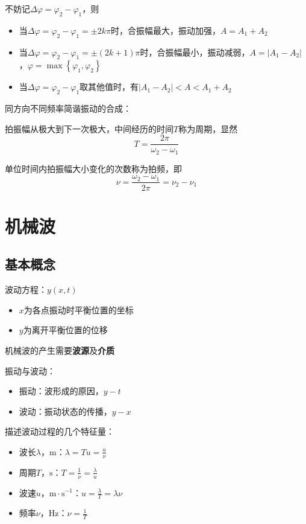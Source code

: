 \documentclass[12pt, a4paper, twoside]{ctexbook}
\begin{document}
不妨记$\Delta\varphi=\varphi_2-\varphi_1$，则
\begin{itemize}
    \item 当$\Delta\varphi=\varphi_2-\varphi_1=\pm 2k\pi$时，合振幅最大，振动加强，$A=A_1+A_2$
    \item 当$\Delta\varphi=\varphi_2-\varphi_1=\pm\left(2k+1\right)\pi$时，合振幅最小，振动减弱，$A=\left|A_1-A_2\right|$，$\varphi=\max\left\{\varphi_1,\varphi_2\right\}$
    \item 当$\Delta\varphi=\varphi_2-\varphi_1$取其他值时，有$\left|A_1-A_2\right|<A<A_1+A_2$
\end{itemize}

{\sonti 同方向不同频率简谐振动的合成}：

拍振幅从极大到下一次极大，中间经历的时间$T$称为周期，显然
$$
T=\frac{2\pi}{\omega_2-\omega_1}
$$

单位时间内拍振幅大小变化的次数称为拍频，即
$$
\nu=\frac{\omega_2-\omega_1}{2\pi}=\nu_2-\nu_1
$$
\chapter{机械波}
\newpage
\section{基本概念}
{\sonti 波动方程}：$y\left(x,t\right)$
\begin{itemize}
    \item $x$为各点振动时平衡位置的坐标
    \item $y$为离开平衡位置的位移
\end{itemize}

{\sonti 机械波}的产生需要\textbf{波源}及\textbf{介质}

{\sonti 振动与波动}：
\begin{itemize}
    \item 振动：波形成的原因，$y-t$
    \item 波动：振动状态的传播，$y-x$
\end{itemize}

{\sonti 描述波动过程的几个特征量}：
\begin{itemize}
    \item 波长$\lambda$，$\mathrm{m}$：$\lambda=Tu=\frac{u}{\nu}$
    \item 周期$T$，$\mathrm{s}$：$T=\frac{1}{\nu}=\frac{\lambda}{u}$
    \item 波速$u$，$\mathrm{m}\cdot\mathrm{s}^{-1}$：$u=\frac{\lambda}{T}=\lambda\nu$
    \item 频率$\nu$，$\mathrm{Hz}$：$\nu=\frac{1}{T}$
\end{itemize}
\end{document}
